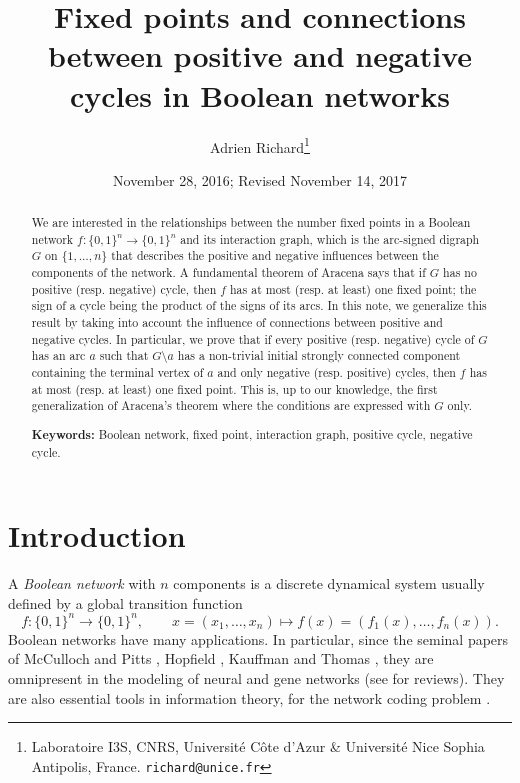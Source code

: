 \documentclass[11pt,a4paper]{article}
\title{Fixed points and connections between positive and negative cycles in Boolean networks}
\author{
Adrien Richard\footnote{Laboratoire I3S, CNRS, Universit\'e C\^ote d'Azur \& Universit\'e Nice Sophia Antipolis, France.
\tt{richard@unice.fr}}
}
\date{November 28, 2016; Revised November 14, 2017}
\def\B{\{0,1\}}
\begin{document}
\maketitle

\begin{abstract} 
We are interested in the relationships between the number fixed points in a Boolean network $f:\B^ n\to\B^n$ and its interaction graph, which is the arc-signed digraph $G$ on $\{1,\dots,n\}$ that describes the positive and negative influences between the components of the network. A fundamental theorem of Aracena says that if $G$ has no positive (resp. negative) cycle, then $f$ has at most (resp. at least) one fixed point; the sign of a cycle being the product of the signs of its arcs. In this note, we generalize this result by taking into account the influence of connections between positive and negative cycles. In particular, we prove that if every positive (resp. negative) cycle of $G$ has an arc $a$ such that $G\setminus a$ has a non-trivial initial strongly connected component containing the terminal vertex of $a$ and only negative (resp. positive) cycles, then $f$ has at most (resp. at least) one fixed point. This is, up to our knowledge, the first generalization of Aracena's theorem where the conditions are expressed with $G$ only. 




\medskip\noindent
{\bf Keywords:} Boolean network, fixed point, interaction graph, positive cycle, negative cycle. 
\end{abstract}

\section{Introduction}


A {\em Boolean network} with $n$ components is a discrete dynamical system usually defined by a global transition function
\[
f:\B^n\to\B^n,\qquad x=(x_1,\dots,x_n)\mapsto f(x)=(f_1(x),\dots,f_n(x)).
\]
Boolean networks have many applications. In particular, since the seminal papers of McCulloch and Pitts \cite{MP43}, Hopfield \cite{H82}, Kauffman \cite{K69,K93} and Thomas \cite{T73,TA90}, they are omnipresent in the modeling of neural and gene networks (see \cite{B08,N15} for reviews). They are also essential tools in information theory, for the network coding problem \cite{ANLY00,GRF16}. 
\end{document}
